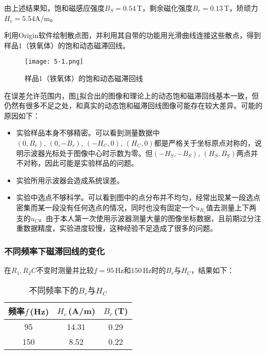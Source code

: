 \documentclass[12pt]{article}
\begin{document}
由上述结果知，饱和磁感应强度$B_S=0.54\,\mathrm{T}$，剩余磁化强度$B_r=0.13\,\mathrm{T}$，矫顽力$H_c=5.54\mathrm{A/m}$。

利用Origin软件绘制散点图，并利用其自带的功能用光滑曲线连接这些散点，得到样品1（铁氧体）的饱和动态磁滞回线。

\begin{figure}[htbp]
    \centering
    \texttt{[image: 5-1.png]}
    \caption{样品1（铁氧体）的饱和动态磁滞回线}
    \label{fig:3}
\end{figure}

在误差允许范围内，图\ref{fig:3}拟合出的图像和理论上的动态饱和磁滞回线基本一致，但仍然有很多不足之处，和真实的动态饱和磁滞回线图像可能存在较大差异。可能的原因如下：

\begin{itemize}
    \item 实验样品本身不够精密。可以看到测量数据中$(0,B_r),\,(0,-B_r),\,(-H_C,0),\,(H_C,0)$都是严格关于坐标原点对称的，说明示波器光标处于图像中心时示数为零。但$(-H_S,-B_S),\,(H_S,B_S)$两点并不对称，因此可能是实验样品的问题。
    \item 实验所用示波器会造成系统误差。
    \item 实验中选点不够科学。可以看到图中的点分布并不均匀，经常出现某一段选点密集而某一段没有任何选点的情况，同时也没有固定一个$u_{R_1}$值去测量上下两支的$u_C$。由于本人第一次使用示波器测量大量的图像坐标数据，且前期过分注重数据精度，实验进度较慢，这种经验不足造成了很多的问题。
\end{itemize}

\subsubsection{不同频率下磁滞回线的变化}

在$ R_1,R_2C $不变时测量并比较$ f=95\,\mathrm{Hz} $和$ 150\,\mathrm{Hz} $时的$ B_r $与$ H_C $，结果如下：

\begin{table}[htbp]
    \centering
      \begin{tabular}{|c|c|c|}
      \hline
      频率$f\,$(Hz)   & $H_c\,$(A/m)    & $B_r\,$(T) \\
      \hline
      95  & 14.31  & 0.29  \\
      \hline
      150 & 8.52  & 0.22  \\
      \hline
      \end{tabular}%
      \caption{不同频率下的$B_r$与$H_C$}
\end{table}%
\end{document}
